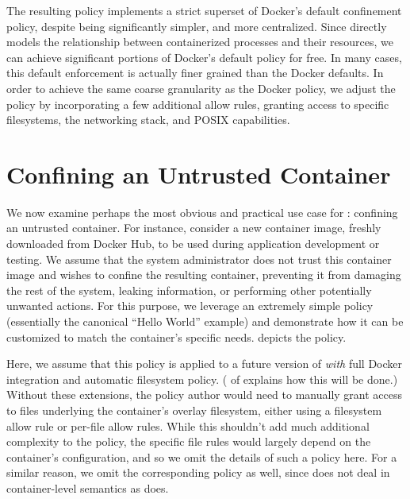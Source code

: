 The resulting \bpfcontain{} policy implements a strict superset of Docker's default
confinement policy, despite being significantly simpler, and more centralized.  Since
\bpfcontain{} directly models the relationship between containerized processes and their
resources, we can achieve significant portions of Docker's default policy for free. In
many cases, this default enforcement is actually finer grained than the Docker defaults.
In order to achieve the same coarse granularity as the Docker policy, we adjust the
\bpfcontain{} policy by incorporating a few additional allow rules, granting access to
specific filesystems, the networking stack, and POSIX capabilities.

\section{Confining an Untrusted Container}

We now examine perhaps the most obvious and practical use case for \bpfcontain{}:
confining an untrusted container. For instance, consider a new container image, freshly
downloaded from Docker Hub, to be used during application development or testing.  We
assume that the system administrator does not trust this container image and wishes to
confine the resulting container, preventing it from damaging the rest of the system,
leaking information, or performing other potentially unwanted actions. For this purpose,
we leverage an extremely simple \bpfcontain{} policy (essentially the canonical
\enquote{Hello World} example) and demonstrate how it can be customized to match the
container's specific needs.  depicts the \bpfcontain{} policy.

Here, we assume that this policy is applied to a future version of \bpfcontain{}
\textit{with} full Docker integration and automatic filesystem policy.
( of  explains how this will be
done.) Without these extensions, the policy author would need to manually grant access to
files underlying the container's overlay filesystem, either using a filesystem allow rule
or per-file allow rules. While this shouldn't add much additional complexity to the
policy, the specific file rules would largely depend on the container's configuration, and
so we omit the details of such a policy here. For a similar reason, we omit the
corresponding \bpfbox{} policy as well, since \bpfbox{} does not deal in container-level
semantics as \bpfcontain{} does.

